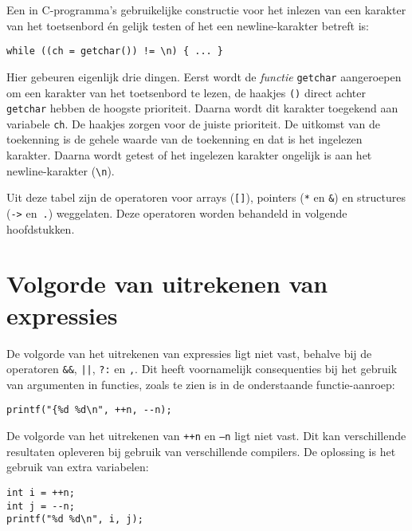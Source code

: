 Een in C-programma's gebruikelijke constructie voor het inlezen van een karakter van het toetsenbord én gelijk testen of het een newline-karakter betreft is:

\hspace*{1em}\texttt{while ((ch = getchar()) != \textquotesingle\textbackslash n\textquotesingle) \{ ... \}}

Hier gebeuren eigenlijk drie dingen. Eerst wordt de \textsl{functie} \texttt{getchar} aangeroepen om een karakter van het toetsenbord te lezen, de haakjes \texttt{()} direct achter \texttt{getchar} hebben de hoogste prioriteit. Daarna wordt dit karakter toegekend aan variabele \texttt{ch}. De haakjes zorgen voor de juiste prioriteit. De uitkomst van de toekenning is de gehele waarde van de toekenning en dat is het ingelezen karakter. Daarna wordt getest of het ingelezen karakter ongelijk is aan het newline-karakter (\lstinline|\n|).


Uit deze tabel zijn de operatoren voor arrays (\texttt{[]}), pointers (\texttt{*} en \texttt{\&}) en structures (\texttt{->} en~\texttt{.}) weggelaten. Deze operatoren worden behandeld in volgende hoofdstukken.


\section{Volgorde van uit\textsl{}rekenen van expressies}
De volgorde van het uitrekenen van expressies ligt niet vast, behalve bij de operatoren \texttt{\&\&}, \texttt{||}, \texttt{?:} en \texttt{,}. Dit heeft voornamelijk consequenties bij het gebruik van argumenten in functies, zoals te zien is in de onderstaande functie-aanroep:

\begin{lstlisting}[style=lstoneline]
printf("{%d %d\n", ++n, --n);
\end{lstlisting}

De volgorde van het uitrekenen van \texttt{++n} en \texttt{--n} ligt niet vast. Dit kan verschillende resultaten opleveren bij gebruik van verschillende compilers. De oplossing is het gebruik van extra variabelen:

\begin{lstlisting}[style=lstoneline]
int i = ++n;
int j = --n;
printf("%d %d\n", i, j);
\end{lstlisting}

